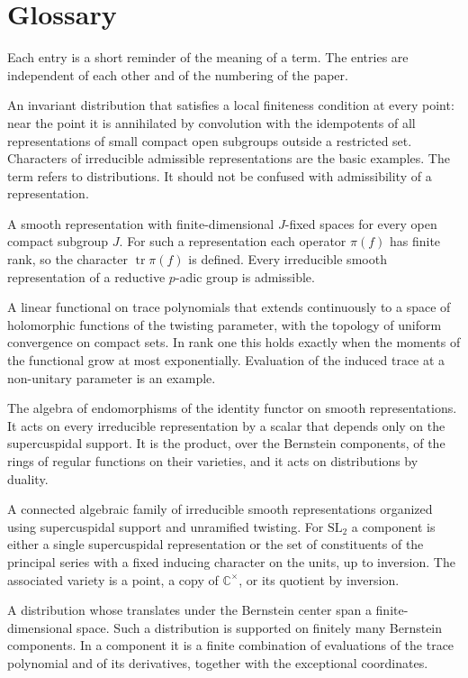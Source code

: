 \documentclass[12pt,letterpaper]{amsart}
\numberwithin{equation}{section}
\theoremstyle{definition}
\theoremstyle{remark}
\newcommand{\tr}{\operatorname{tr}}
\begin{document}
\section*{Glossary}\label{app:glossary}
Each entry is a short reminder of the meaning of a term. The entries are independent of each other and of the numbering of the paper.
\begin{description}[style=nextline,leftmargin=1em]
\item[Admissible distribution] An invariant distribution that satisfies a local finiteness condition at every point: near the point it is annihilated by convolution with the idempotents of all representations of small compact open subgroups outside a restricted set. Characters of irreducible admissible representations are the basic examples. The term refers to distributions. It should not be confused with admissibility of a representation.
\item[Admissible representation] A smooth representation with finite-dimensional $J$-fixed spaces for every open compact subgroup $J$. For such a representation each operator $\pi(f)$ has finite rank, so the character $\tr\pi(f)$ is defined. Every irreducible smooth representation of a reductive $p$-adic group is admissible.
\item[Analytic spectral functional] A linear functional on trace polynomials that extends continuously to a space of holomorphic functions of the twisting parameter, with the topology of uniform convergence on compact sets. In rank one this holds exactly when the moments of the functional grow at most exponentially. Evaluation of the induced trace at a non-unitary parameter is an example.
\item[Bernstein center] The algebra of endomorphisms of the identity functor on smooth representations. It acts on every irreducible representation by a scalar that depends only on the supercuspidal support. It is the product, over the Bernstein components, of the rings of regular functions on their varieties, and it acts on distributions by duality.
\item[Bernstein component] A connected algebraic family of irreducible smooth representations organized using supercuspidal support and unramified twisting. For $\mathrm{SL}_2$ a component is either a single supercuspidal representation or the set of constituents of the principal series with a fixed inducing character on the units, up to inversion. The associated variety is a point, a copy of $\mathbb C^\times$, or its quotient by inversion.
\item[Center-finite distribution] A distribution whose translates under the Bernstein center span a finite-dimensional space. Such a distribution is supported on finitely many Bernstein components. In a component it is a finite combination of evaluations of the trace polynomial and of its derivatives, together with the exceptional coordinates.

\end{description}
\end{document}
